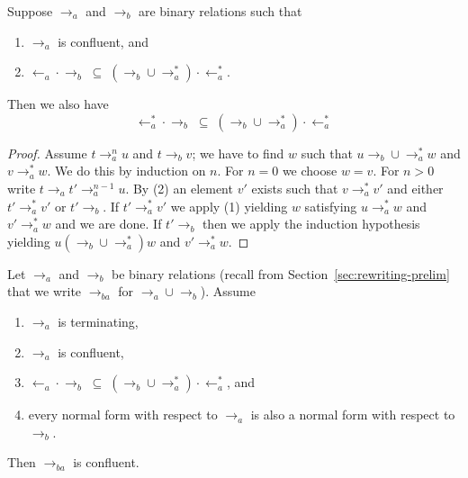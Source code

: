 \documentclass{LMCS}
\newcommand{\subse}{\; \subseteq \;}
\begin{document}
\begin{lem}
\label{lem:extendac}
Suppose $\to_a$ and $\to_b$ are binary relations such that
\begin{enumerate}[\em(1)]
\item $\to_a$ is confluent, and
\item $\leftarrow_a \cdot \to_b \subse (\to_b \cup \to_a^*) \cdot \leftarrow_a^*$.
\end{enumerate}
Then we also have
\[ \leftarrow_a^* \cdot \to_b \subse (\to_b \cup \to_a^*) \cdot \leftarrow_a^*\]
\end{lem}
\begin{proof}
Assume $t \to_a^n u$ and $t \to_b v$; we have to find $w$ such that $u
\to_b \cup \to_a^* w$ and $v \to_a^* w$. We do this by induction on
$n$. For $n=0$ we choose $w = v$. For $n > 0$ write $t \to_a t'
\to_a^{n-1} u$. By (2) an element $v'$ exists such that $v \to_a^* v'$
and either $t' \to_a^* v'$ or $t' \to_b$. If $t' \to_a^* v'$ we apply
(1) yielding $w$ satisfying $u \to_a^* w$ and $v' \to_a^* w$ and we
are done. If $t' \to_b$ then we apply the induction hypothesis
yielding $u (\to_b \cup \to_a^*) w$ and $v' \to_a^* w$.
\end{proof}

\begin{thm}
\label{thmcr}
Let $\to_a$ and $\to_b$ be binary relations (recall from
Section~\ref{sec:rewriting-prelim} that we write $\to_{ba}$ for $\to_a
\cup \to_b$). Assume
\begin{enumerate}[\em(1)]
\item $\to_a$ is terminating,
\item $\to_a$ is confluent,
\item $\leftarrow_a \cdot \to_b \subse (\to_b \cup \to_a^*) \cdot \leftarrow_a^*$, and
\item every normal form with respect to $\to_a$
is also a normal form with respect to $\to_b$.
\end{enumerate}
Then $\to_{ba}$  is confluent.
\end{thm}
\end{document}
